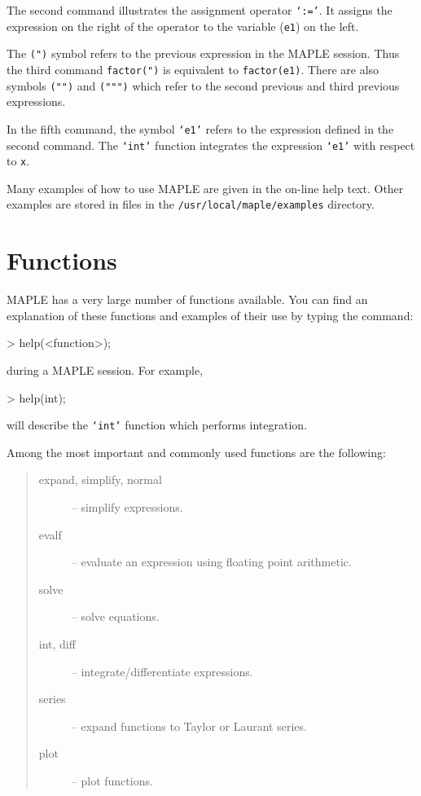 \documentclass[twoside,11pt]{starlink}
\begin{document}
The second command illustrates the assignment operator \texttt{`:='}. It
assigns the expression on the right of the operator to the variable
(\texttt{e1}) on the left.

The \texttt{(")} symbol refers to the previous expression in the MAPLE
session. Thus the third command \texttt{factor(")} is equivalent to
\texttt{factor(e1)}. There are also symbols \texttt{("")} and \texttt{(""")}
which refer to the second previous and third previous expressions.

In the fifth command, the symbol \texttt{`e1'} refers to the expression
defined in the second command. The \texttt{`int'} function integrates the
expression \texttt{`e1'} with respect to \texttt{x}.

Many examples of how to use MAPLE are given in the on-line help text.
Other examples are stored in files in the \texttt{/usr/local/maple/examples}
directory.

\section{Functions}

MAPLE has a very large number of functions available. You can find an
explanation of these functions and examples of their use by typing the
command:

\begin{terminalv}
> help(<function>);
\end{terminalv}

during a MAPLE session. For example,

\begin{terminalv}
> help(int);
\end{terminalv}

will describe the \texttt{`int'} function which performs integration.

Among the most important and commonly used functions are the following:

\begin{quote}
\begin{description}

\item [expand, simplify, normal] -- simplify expressions.
\item [evalf] -- evaluate an expression using floating point arithmetic.
\item [solve] -- solve equations.
\item [int, diff] -- integrate/differentiate expressions.
\item [series] -- expand functions to Taylor or Laurant series.
\item [plot] -- plot functions.

\end{description}
\end{quote}
\end{document}
